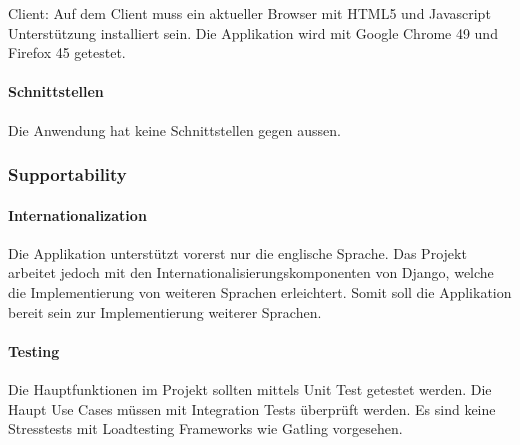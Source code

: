 Client: Auf dem Client muss ein aktueller Browser mit HTML5 und Javascript Unterstützung installiert sein. Die Applikation wird mit Google Chrome 49 und Firefox 45 getestet.

\paragraph{Schnittstellen}
Die Anwendung hat keine Schnittstellen gegen aussen.


\subsubsection{Supportability}
\paragraph{Internationalization}
Die Applikation unterstützt vorerst nur die englische Sprache. Das Projekt arbeitet jedoch mit den Internationalisierungskomponenten von Django, welche die Implementierung von weiteren Sprachen erleichtert. Somit soll die Applikation bereit sein zur Implementierung weiterer Sprachen.

\paragraph{Testing}
Die Hauptfunktionen im Projekt sollten mittels Unit Test getestet werden. Die Haupt Use Cases müssen mit Integration Tests überprüft werden. Es sind keine Stresstests mit Loadtesting Frameworks wie Gatling vorgesehen.



